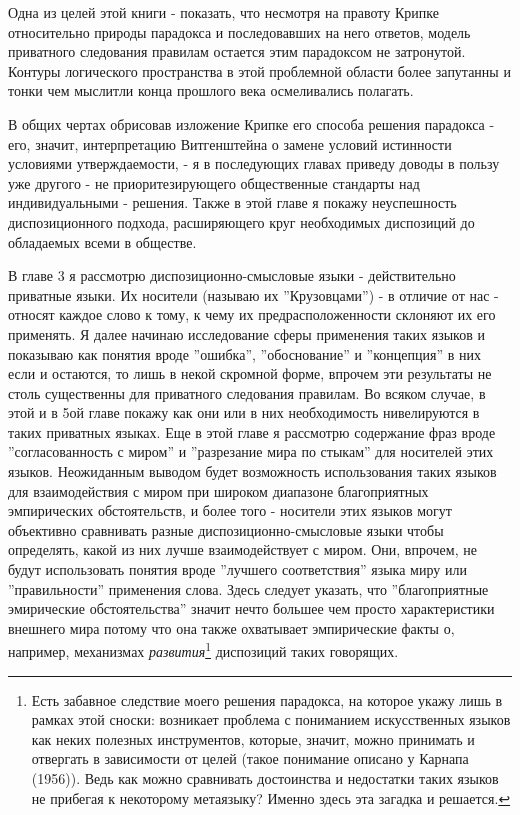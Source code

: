 \documentclass[12pt]{book}
\begin{document}
\smallskip

Одна из целей этой книги - показать, что несмотря на правоту Крипке относительно природы парадокса и последовавших на него ответов, модель приватного следования правилам остается этим парадоксом не затронутой. Контуры логического пространства в этой проблемной области более запутанны и тонки чем мыслитли конца прошлого века осмеливались полагать.

В общих чертах обрисовав изложение Крипке его способа решения парадокса - его, значит, интерпретацию Витгенштейна о замене условий истинности условиями утверждаемости, - я в последующих главах приведу доводы в пользу уже другого - не приоритезирующего общественные стандарты над индивидуальными - решения. Также в этой главе я покажу неуспешность диспозиционного подхода, расширяющего круг необходимых диспозиций до обладаемых всеми в обществе.

В главе 3 я рассмотрю диспозиционно-смысловые языки - действительно приватные языки. Их носители (называю их ''Крузовцами'') - в отличие от нас - относят каждое слово к тому, к чему их предрасположенности склоняют их его применять. Я далее начинаю исследование сферы применения таких языков и показываю как понятия вроде ''ошибка'', ''обоснование'' и ''концепция'' в них если и остаются, то лишь в некой скромной форме, впрочем эти результаты не столь существенны для приватного следования правилам. Во всяком случае, в этой и в 5ой главе покажу как они или в них необходимость нивелируются в таких приватных языках. Еще в этой главе я рассмотрю содержание фраз вроде ''согласованность с миром'' и ''разрезание мира по стыкам'' для носителей этих языков. Неожиданным выводом будет возможность использования таких языков для взаимодействия с миром при широком диапазоне благоприятных эмпирических обстоятельств, и более того - носители этих языков могут объективно сравнивать разные диспозиционно-смысловые языки чтобы определять, какой из них лучше взаимодействует с миром. Они, впрочем, не будут использовать понятия вроде ''лучшего соответствия'' языка миру или ''правильности'' применения слова. Здесь следует указать, что ''благоприятные эмирические обстоятельства'' значит нечто большее чем просто характеристики внешнего мира потому что она также охватывает эмпирические факты о, например, механизмах \textit{развития}\footnote{Есть забавное следствие моего решения парадокса, на которое укажу лишь в рамках этой сноски: возникает проблема с пониманием искусственных языков как неких полезных инструментов, которые, значит, можно принимать и отвергать в зависимости от целей (такое понимание описано у Карнапа (1956)). Ведь как можно сравнивать достоинства и недостатки таких языков не прибегая к некоторому метаязыку? Именно здесь эта загадка и решается.} диспозиций таких говорящих.
\end{document}
